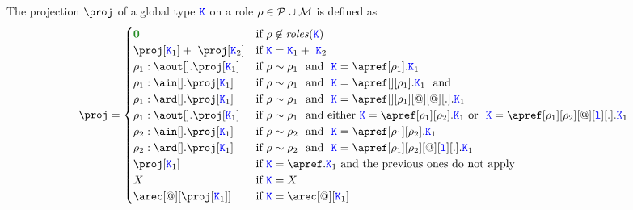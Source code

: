 The projection $\proj$ of a global type $\texttt{\textcolor{blue}K}$ on a role $\rho \in \mathcal{P} \cup \mathcal{M}$ is
defined as
\[
  \proj =
  \begin{cases}
    \nil   
    & \text{if } 
        \arole \not \in \roles \aK  
    \\
    \proj[\aK_1] +\ \proj[\aK_2]   
    & \text{if } 
        \aK = \aK_1 +\  \aK_2  
    \\
    \arole_1 : \aout[].\proj[\aK_1]   
    & \text{if } 
        \arole \eqR \arole_1\  \text{ and }\ \aK = \apref[\arole_1].\aK_1  
    \\
    \arole_1 : \ain[].\proj[\aK_1]
    & \text{if } 
      	\arole \eqR \arole_1\  \text{ and }\ \aK = \apref[{}][\arole_1].\aK_1  \ \text{ and }
    \\
    \arole_1 : \ard[].\proj[\aK_1]
    & \text{if } 
    	\arole \eqR \arole_1\  \text{ and }\ \aK = \apref[{}][\arole_1][@][@][.].\aK_1
    \\
    \arole_1 : \aout[].\proj[\aK_1]   
    & \text{if } 
    \arole \eqR \arole_1\  \text{ and either}\  
    \aK = \apref[\arole_1][\arole_2].\aK_1 \text{ or }\ \aK = \apref[\arole_1][\arole_2][@][\aloc][.].\aK_1
     \\
    \arole_2 : \ain[].\proj[\aK_1]   
    & \text{if } 
    \arole \eqR \arole_2\  \text{ and }\  
    \aK = \apref[\arole_1][\arole_2].\aK_1
    \\
    \arole_2 : \ard[].\proj[\aK_1]   
    & \text{if } 
    \arole \eqR \arole_2\  \text{ and }\  
    \aK = \apref[\arole_1][\arole_2][@][\aloc][.].\aK_1
    \\
    \proj[\aK_1]   
    & \text{if } \aK = \apref.\aK_1
    \text{ and the previous ones do not apply}
   \\
    X & \text{if } \aK = X \\
    \arec[@][{\proj[\aK_1]}] & \text{if } \aK = \arec[@][\aK_1]
  \end{cases}
\]


